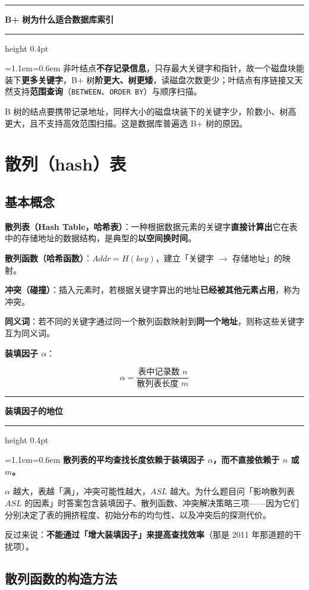 \documentclass[11pt,openany,UTF8]{ctexbook}
\newcommand{\callouthead}[2]{%
  \par\addvspace{7pt}\noindent
  {\color{#1}\rule[-0.15em]{3pt}{1.05em}}\hspace{0.5em}%
  {\bfseries\color{#1}#2}\par\nobreak\vspace{-0.35em}%
  {\color{rulesep}\hrule height 0.4pt}\nobreak\vspace{0.45em}%
  \begingroup\small\setlength{\parindent}{0pt}%
  \leftskip=1.1em\rightskip=0.6em\noindent\ignorespaces}
\newcommand{\calloutend}{\par\endgroup\addvspace{7pt}}
\newenvironment{callkey}[1]{\callouthead{keybar}{#1}}{\calloutend}
\begin{document}
\begin{callkey}{B+ 树为什么适合数据库索引}
非叶结点\textbf{不存记录信息}，只存最大关键字和指针，故一个磁盘块能装下\textbf{更多关键字}，B+ 树\textbf{阶更大、树更矮}，读磁盘次数更少；叶结点有序链接又天然支持\textbf{范围查询}（\texttt{BETWEEN}、\texttt{ORDER BY}）与顺序扫描。

B 树的结点要携带记录地址，同样大小的磁盘块装下的关键字少，阶数小、树高更大，且不支持高效范围扫描。这是数据库普遍选 B+ 树的原因。

\end{callkey}

\section{散列（hash）表}

\subsection{基本概念}

\textbf{散列表（Hash Table，哈希表）}：一种根据数据元素的关键字\textbf{直接计算出}它在表中的存储地址的数据结构，是典型的\textbf{以空间换时间}。

\textbf{散列函数（哈希函数）}：$Addr=H(key)$，建立「关键字 $\to$ 存储地址」的映射。

\textbf{冲突（碰撞）}：插入元素时，若根据关键字算出的地址\textbf{已经被其他元素占用}，称为冲突。

\textbf{同义词}：若不同的关键字通过同一个散列函数映射到\textbf{同一个地址}，则称这些关键字互为同义词。

\textbf{装填因子 $\alpha$}：

\[\alpha=\frac{\text{表中记录数 }n}{\text{散列表长度 }m}\]

\begin{callkey}{装填因子的地位}
\textbf{散列表的平均查找长度依赖于装填因子 $\alpha$，而不直接依赖于 $n$ 或 $m$。}

$\alpha$ 越大，表越「满」，冲突可能性越大，$ASL$ 越大。为什么题目问「影响散列表 $ASL$ 的因素」时答案包含装填因子、散列函数、冲突解决策略三项——因为它们分别决定了表的拥挤程度、初始分布的均匀性、以及冲突后的探测代价。

反过来说：\textbf{不能通过「增大装填因子」来提高查找效率}（那是 2011 年那道题的干扰项）。

\end{callkey}

\subsection{散列函数的构造方法}
\end{document}
